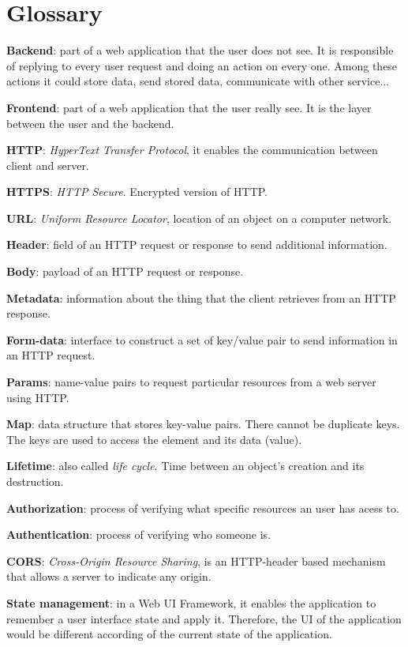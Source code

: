 \chapter{Glossary}

\textbf{Backend}: part of a web application that the user does not see. It is responsible of replying to every user request and doing an action on every one. Among these actions it could store data, send stored data, communicate with other service...
\bigskip

\textbf{Frontend}: part of a web application that the user really see. It is the layer between the user and the backend.
\bigskip

\textbf{HTTP}: \textit{HyperText Transfer Protocol}, it enables the communication between client and server. 
\bigskip

\textbf{HTTPS}: \textit{HTTP Secure}. Encrypted version of HTTP.
\bigskip

\textbf{URL}: \textit{Uniform Resource Locator}, location of an object on a computer network.
\bigskip

\textbf{Header}: field of an HTTP request or response to send additional information.
\bigskip

\textbf{Body}: payload of an HTTP request or response.
\bigskip

\textbf{Metadata}: information about the thing that the client retrieves from an HTTP response.
\bigskip

\textbf{Form-data}: interface to construct a set of key/value pair to send information in an HTTP request.
\bigskip

\textbf{Params}: name-value pairs to request particular resources from a web server using HTTP.
\bigskip

\textbf{Map}: data structure that stores key-value pairs. There cannot be duplicate keys. The keys are used to access the element and its data (value).
\bigskip

\textbf{Lifetime}: also called \textit{life cycle}. Time between an object's creation and its destruction.
\bigskip

\textbf{Authorization}: process of verifying what specific resources an user has acess to.
\bigskip

\textbf{Authentication}: process of verifying who someone is.
\bigskip

\textbf{CORS}: \textit{Cross-Origin Resource Sharing}, is an HTTP-header based mechanism that allows a server to indicate any origin.
\bigskip

\textbf{State management}: in a Web UI Framework, it enables the application to remember a user interface state and apply it. Therefore, the UI of the application would be different according of the current state of the application.
\bigskip


